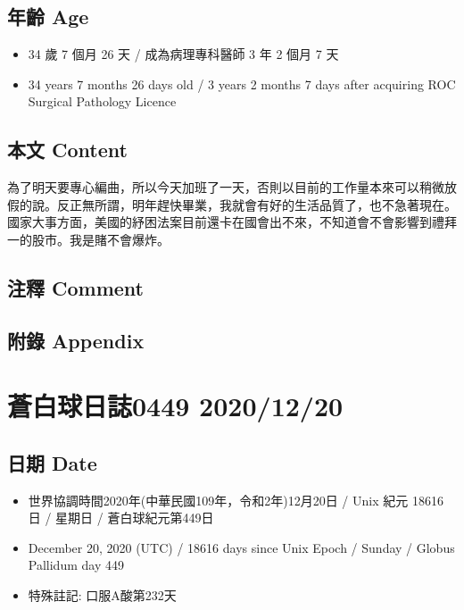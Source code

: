 \documentclass[
]{article}
\providecommand{\tightlist}{%
  \setlength{\itemsep}{0pt}\setlength{\parskip}{0pt}}
\begin{document}
\hypertarget{ux5e74ux9f61-age-18}{%
\subsection{年齡 Age}\label{ux5e74ux9f61-age-18}}

\begin{itemize}
\tightlist
\item
  34 歲 7 個月 26 天 / 成為病理專科醫師 3 年 2 個月 7 天
\item
  34 years 7 months 26 days old / 3 years 2 months 7 days after
  acquiring ROC Surgical Pathology Licence
\end{itemize}

\hypertarget{ux672cux6587-content-18}{%
\subsection{本文 Content}\label{ux672cux6587-content-18}}

為了明天要專心編曲，所以今天加班了一天，否則以目前的工作量本來可以稍微放假的說。反正無所謂，明年趕快畢業，我就會有好的生活品質了，也不急著現在。國家大事方面，美國的紓困法案目前還卡在國會出不來，不知道會不會影響到禮拜一的股市。我是賭不會爆炸。

\hypertarget{ux6ce8ux91cb-comment-18}{%
\subsection{注釋 Comment}\label{ux6ce8ux91cb-comment-18}}

\hypertarget{ux9644ux9304-appendix-18}{%
\subsection{附錄 Appendix}\label{ux9644ux9304-appendix-18}}

\hypertarget{ux84bcux767dux7403ux65e5ux8a8c0449-20201220}{%
\section{蒼白球日誌0449
2020/12/20}\label{ux84bcux767dux7403ux65e5ux8a8c0449-20201220}}

\hypertarget{ux65e5ux671f-date-19}{%
\subsection{日期 Date}\label{ux65e5ux671f-date-19}}

\begin{itemize}
\tightlist
\item
  世界協調時間2020年(中華民國109年，令和2年)12月20日 / Unix 紀元 18616
  日 / 星期日 / 蒼白球紀元第449日
\item
  December 20, 2020 (UTC) / 18616 days since Unix Epoch / Sunday /
  Globus Pallidum day 449
\item
  特殊註記: 口服A酸第232天
\end{itemize}
\end{document}
